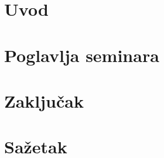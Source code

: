 \documentclass{ferseminar}
\begin{document}
\stvoripredstranice
\section{Uvod}
\section{Poglavlja seminara}
\section{Zaključak}
\section{Sažetak}
\end{document}
